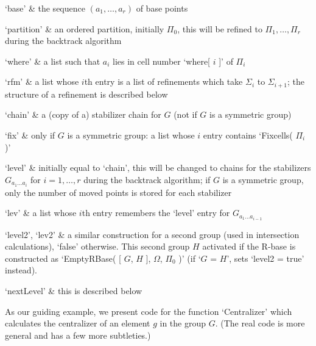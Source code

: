 `base' &
    the sequence $(a_1,\ldots,a_r)$ of base points

`partition' &
    an  ordered  partition, initially  $\Pi_0$, this  will be  refined to
    $\Pi_1,\ldots,\Pi_r$ during the backtrack algorithm

`where' &
    a list such that $a_i$ lies in cell number `where[ $i$ ]' of $\Pi_i$

`rfm' &
    a    list whose $i$th entry  is   a  list of   refinements which take
    $\Sigma_i$  to $\Sigma_{i+1}$;  the    structure of a  refinement  is
    described below

`chain' &
    a (copy of a) stabilizer  chain for $G$ (not  if  $G$ is a  symmetric
    group)

`fix' &
    only if  $G$ is a  symmetric group:  a list whose  $i$ entry contains
    `Fixcells( $\Pi_i$ )'

`level' &
    initially equal to `chain',  this will be changed  to chains  for the
    stabilizers  $G_{a_1\dots  a_i}$    for  $i=1,\ldots,r$  during   the
    backtrack algorithm; if $G$ is a  symmetric group, only the number of
    moved points is stored for each stabilizer

`lev' &
    a  list   whose  $i$th  entry   remembers   the  `level' entry    for
    $G_{a_1\ldots a_{i-1}}$

`level2', `lev2' &
    a similar  construction   for a second  group  (used  in intersection
    calculations), `false' otherwise.  This second group $H$ activated if
    the R-base  is constructed as  `EmptyRBase(  [ $G$, $H$  ], $\Omega$,
    $\Pi_0$ )' (if `$G$ = $H$', {\GAP} sets `level2 = true' instead).

`nextLevel' &
    this is described below
\enditems

As  our guiding example, we  present  code for the function `Centralizer'
which calculates the centralizer of an element $g$ in the group $G$. (The
real code is more general and has a few more subtleties.)


